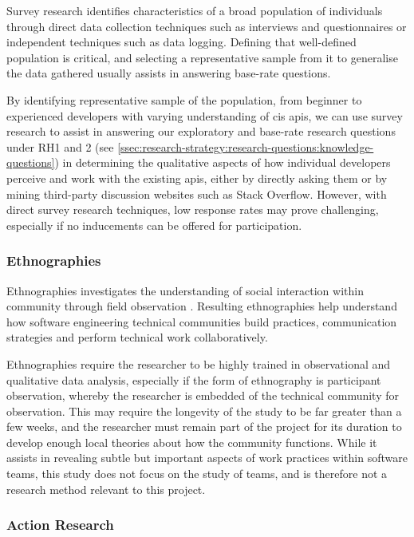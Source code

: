 Survey research identifies characteristics of a broad population of individuals through direct data collection techniques such as interviews and questionnaires or independent techniques such as data logging. Defining that well-defined population is critical, and selecting a representative sample from it to generalise the data gathered usually assists in answering base-rate questions.

By identifying representative sample of the population, from beginner to experienced developers with varying understanding of \gls{cis} \glspl{api}, we can use survey research to assist in answering our exploratory and base-rate research questions under RH1 and 2 (see \cref{ssec:research-strategy:research-questions:knowledge-questions}) in determining the qualitative aspects of how individual developers perceive and work with the existing \glspl{api}, either by directly asking them or by mining third-party discussion websites such as Stack Overflow. However, with direct survey research techniques, low response rates may prove challenging, especially if no inducements can be offered for participation.

\subsubsection{Ethnographies}

Ethnographies investigates the understanding of social interaction within community through field observation . Resulting ethnographies help understand how software engineering technical communities build practices, communication strategies and perform technical work collaboratively. 

Ethnographies require the researcher to be highly trained in observational and qualitative data analysis, especially if the form of ethnography is participant observation, whereby the researcher is embedded of the technical community for observation. This may require the longevity of the study to be far greater than a few weeks, and the researcher must remain part of the project for its duration to develop enough local theories about how the community functions. While it assists in revealing subtle but important aspects of work practices within software teams, this study does not focus on the study of teams, and is therefore not a research method relevant to this project.


\subsubsection{Action Research}

